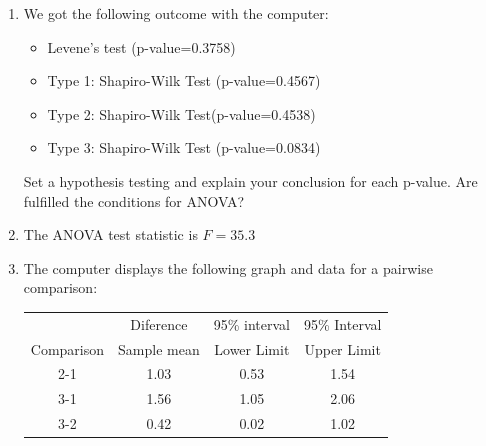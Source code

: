 \begin{problem}
\begin{enumerate}
\item We got the following outcome with the computer:
    \begin{itemize}
    \item Levene's test (p-value=0.3758)
    \item Type 1:  Shapiro-Wilk Test (p-value=0.4567)
    \item Type 2:  Shapiro-Wilk Test(p-value=0.4538)
    \item Type  3: Shapiro-Wilk Test (p-value=0.0834)
    \end{itemize}
    Set a hypothesis testing and explain your
    conclusion for each p-value. Are fulfilled  the conditions for
    ANOVA? 

\item The ANOVA  test statistic is $F=35.3$

\item The computer displays the following graph and data for a pairwise
  comparison: 



\begin{tabular}{|c|c|c|c|}
  \hline
   & Diference& 95\% interval& 95\% Interval\\
  Comparison& Sample mean & Lower Limit& Upper Limit \\

  \hline
  2-1 & 1.03 & 0.53 & 1.54 \\
  3-1 & 1.56 & 1.05 & 2.06 \\
  3-2 & 0.42 & 0.02 & 1.02 \\
  \hline
\end{tabular}


\end{enumerate}
\end{problem}
